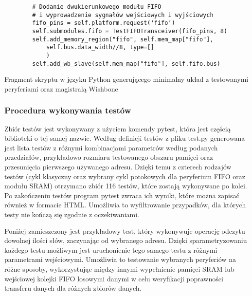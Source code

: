 \begin{longlisting}
\begin{verbatim}
        # Dodanie dwukierunkowego modułu FIFO
        # i wyprowadzenie sygnałów wejściowych i wyjściowych
        fifo_pins = self.platform.request('fifo')
        self.submodules.fifo = TestFIFOTransceiver(fifo_pins, 8)
        self.add_memory_region("fifo", self.mem_map["fifo"],
            self.bus.data_width//8, type=[]
            )
        self.add_wb_slave(self.mem_map["fifo"], self.fifo.bus)
\end{verbatim}
\caption{\label{lst:harness-basesoc}Fragment skryptu w języku Python generującego minimalny układ z testowanymi peryferiami oraz magistralą Wishbone}
\end{longlisting}

\subsubsection{Procedura wykonywania testów}
Zbiór testów jest wykonywany z użyciem komendy pytest, która jest częścią biblioteki o tej samej nazwie. Według definicji testów z pliku test.py generowana jest lista testów z różnymi kombinacjami parametrów według podanych przedziałów, przykładowo rozmiaru testowanego obszaru pamięci oraz przesunięcia pierwszego używanego adresu. Dzięki temu z czterech rodzajów testów (cykl klasyczny oraz wybrany cykl potokowych dla peryferium FIFO oraz modułu SRAM) otrzymano zbiór 116 testów, które zostają wykonywane po kolei. Po zakończeniu testów program pytest zwraca ich wyniki, które można zapisać również w formacie HTML. Umożliwia to wyfiltrowanie przypadków, dla których testy nie kończą się zgodnie z oczekiwaniami.

Poniżej zamieszczony jest przykładowy test, który wykonywuje operację odczytu dowolnej ilości słów, zaczynając od wybranego adresu. Dzięki sparametryzowaniu każdego testu możliwym jest uruchonienie tego samego testu z różnymi parametrami wejściowymi. Umożliwia to testowanie wybranych peryferiów na różne sposoby, wykorzystując między innymi wypełnienie pamięci SRAM lub wejściowej kolejki FIFO losowymi danymi w celu weryfikacji poprawności transferu danych dla różnych zbiorów danych.

